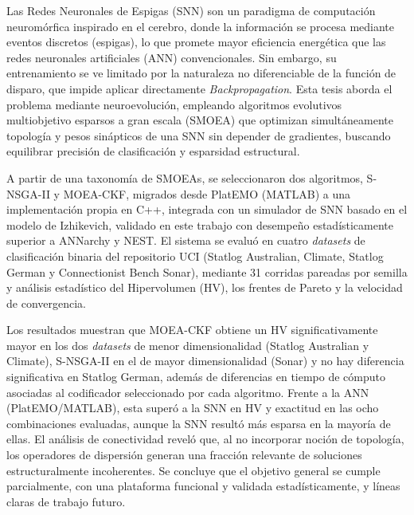 \documentclass[dosguias,openany]{tesisusach}
\begin{document}
	
	\begin{resumenEs}
		Las Redes Neuronales de Espigas (SNN) son un paradigma de computación neuromórfica inspirado en el cerebro, donde la información se procesa mediante eventos discretos (espigas), lo que promete mayor eficiencia energética que las redes neuronales artificiales (ANN) convencionales. Sin embargo, su entrenamiento se ve limitado por la naturaleza no diferenciable de la función de disparo, que impide aplicar directamente \textit{Backpropagation}. Esta tesis aborda el problema mediante neuroevolución, empleando algoritmos evolutivos multiobjetivo esparsos a gran escala (SMOEA) que optimizan simultáneamente topología y pesos sinápticos de una SNN sin depender de gradientes, buscando equilibrar precisión de clasificación y esparsidad estructural.

		A partir de una taxonomía de SMOEAs, se seleccionaron dos algoritmos, S-NSGA-II y MOEA-CKF, migrados desde PlatEMO (MATLAB) a una implementación propia en C++, integrada con un simulador de SNN basado en el modelo de Izhikevich, validado en este trabajo con desempeño estadísticamente superior a ANNarchy y NEST. El sistema se evaluó en cuatro \textit{datasets} de clasificación binaria del repositorio UCI (Statlog Australian, Climate, Statlog German y Connectionist Bench Sonar), mediante 31 corridas pareadas por semilla y análisis estadístico del Hipervolumen (HV), los frentes de Pareto y la velocidad de convergencia.

		Los resultados muestran que MOEA-CKF obtiene un HV significativamente mayor en los dos \textit{datasets} de menor dimensionalidad (Statlog Australian y Climate), S-NSGA-II en el de mayor dimensionalidad (Sonar) y no hay diferencia significativa en Statlog German, además de diferencias en tiempo de cómputo asociadas al codificador seleccionado por cada algoritmo. Frente a la ANN (PlatEMO/MATLAB), esta superó a la SNN en HV y exactitud en las ocho combinaciones evaluadas, aunque la SNN resultó más esparsa en la mayoría de ellas. El análisis de conectividad reveló que, al no incorporar noción de topología, los operadores de dispersión generan una fracción relevante de soluciones estructuralmente incoherentes. Se concluye que el objetivo general se cumple parcialmente, con una plataforma funcional y validada estadísticamente, y líneas claras de trabajo futuro.
	\end{resumenEs}
\end{document}
